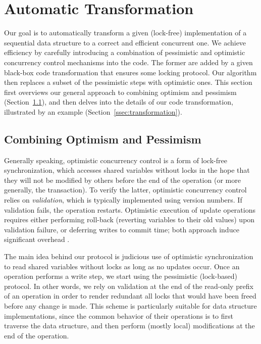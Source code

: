 \section{Automatic Transformation}\label{sec:algorithm}

Our goal is to automatically transform a given (lock-free) implementation of a sequential data structure to a correct and efficient concurrent one.
We achieve efficiency by carefully introducing a combination of pessimistic and optimistic concurrency control mechanisms into the code. The former are 
added by a given black-box code transformation that ensures some locking protocol. Our algorithm then replaces a subset of the pessimistic
steps with optimistic ones. This section first overviews our general approach to combining optimism and pessimism (Section~\ref{ssec:overview}), and
then delves into the details of our code transformation, illustrated by an example (Section~\ref{ssec:transformation}).

\subsection{Combining Optimism and Pessimism}\label{ssec:overview}

Generally speaking, optimistic concurrency control is a form of lock-free synchronization, which accesses shared variables without locks in the hope that they will not be modified by others before the end of the operation (or more generally, the transaction). To verify the latter, optimistic concurrency control relies on \emph{validation}, which is typically implemented using version numbers. If validation fails, the operation restarts. Optimistic execution of update operations requires either performing roll-back (reverting variables to their old values) upon validation failure, or deferring writes to commit time; both approach induce significant overhead . 


The main idea behind our protocol is judicious use of optimistic synchronization to read 
shared variables without locks as long as no updates occur. Once an operation
performs a write step, we start using the pessimistic (lock-based) protocol. In
other words, we rely on validation at the end of the read-only prefix of an operation in order to render redundant all locks that would have been freed
before any change is made.
This scheme is particularly suitable for data structure implementations,
since the common behavior of their operations 
is to first traverse the data structure, and then 
perform (mostly local) modifications at the end of the operation.


